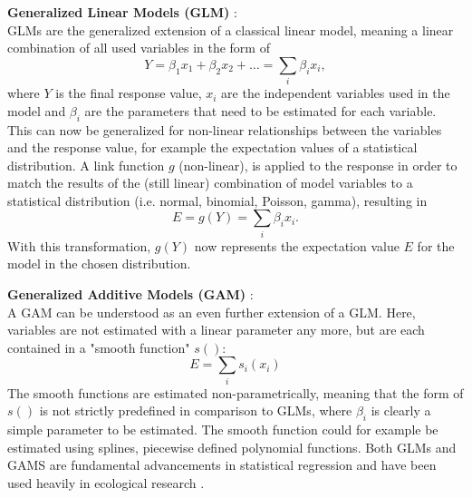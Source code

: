 \documentclass[12pt,a4paper]{article}
\begin{document}
\textbf{Generalized Linear Models (GLM)} \cite{nelder1972glm}:\\
GLMs are the generalized extension of a classical linear model, meaning a linear combination of all used variables in the form of
\begin{equation}
    \label{eq:lm}
    Y = \beta_1 x_1 + \beta_2 x_2 + \dots = \sum_{i} \beta_i x_i,
\end{equation}
where $Y$ is the final response value, $x_i$ are the independent variables used in the model and $\beta_i$ are the parameters that need to be estimated for each variable.
This can now be generalized for non-linear relationships between the variables and the response value, for example the expectation values of a statistical distribution.
A link function $g$ (non-linear), is applied to the response in order to match the results of the (still linear) combination of model variables to a statistical distribution (i.e. normal, binomial, Poisson, gamma), resulting in
\begin{equation}
    \label{eq:glm}
    E = g(Y) = \sum_{i} \beta_i x_i .
\end{equation}
With this transformation, $g(Y)$ now represents the expectation value $E$ for the model in the chosen distribution.

\textbf{Generalized Additive Models (GAM)} \cite{hastie1986gam}:\\
A GAM can be understood as an even further extension of a GLM. Here, variables are not estimated with a linear parameter any more, but are each contained in a "smooth function" $s()$:
\begin{equation}
    \label{eq:gam}
    E = \sum_{i} s_i(x_i)
\end{equation}
The smooth functions are estimated non-parametrically, meaning that the form of $s()$ is not strictly predefined in comparison to GLMs, where $\beta_i$ is clearly a simple parameter to be estimated.
The smooth function could for example be estimated using splines, piecewise defined polynomial functions.
Both GLMs and GAMS are fundamental advancements in statistical regression and have been used heavily in ecological research \cite{guisan2002glm-gam}.
\end{document}
